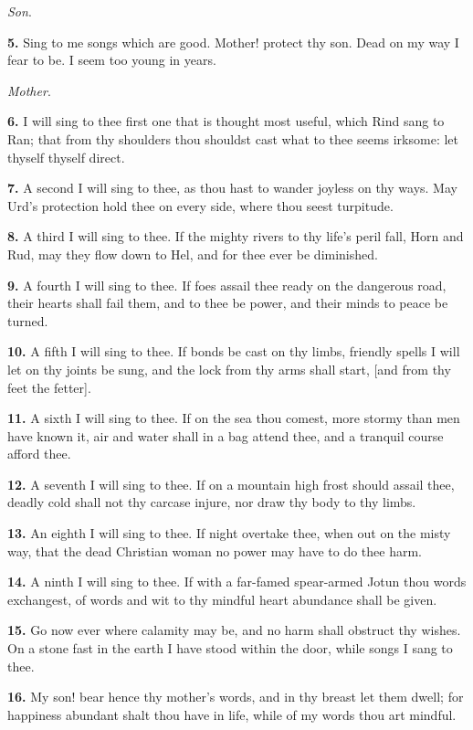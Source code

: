 \emph{Son}.

\textbf{5.} Sing to me songs which are good. Mother! protect thy son. Dead on
my way I fear to be. I seem too young in years.

\emph{Mother}.

\textbf{6.} I will sing to thee first one that is thought most useful, which
Rind sang to Ran; that from thy shoulders thou shouldst cast what to
thee seems irksome: let thyself thyself direct.

\textbf{7.} A second I will sing to thee, as thou hast to wander joyless on
thy ways. May Urd's protection hold thee on every side, where thou
seest turpitude.

\textbf{8.} A third I will sing to thee. If the mighty rivers to thy life's
peril fall, Horn and Rud, may they flow down to Hel, and for thee ever
be diminished.

\textbf{9.} A fourth I will sing to thee. If foes assail thee ready on the
dangerous road, their hearts shall fail them, and to thee be power,
and their minds to peace be turned.

\textbf{10.} A fifth I will sing to thee. If bonds be cast on thy limbs,
friendly spells I will let on thy joints be sung, and the lock from
thy arms shall start, [and from thy feet the fetter].

\textbf{11.} A sixth I will sing to thee. If on the sea thou comest, more
stormy than men have known it, air and water shall in a bag attend
thee, and a tranquil course afford thee.

\textbf{12.} A seventh I will sing to thee. If on a mountain high frost
should assail thee, deadly cold shall not thy carcase injure, nor draw
thy body to thy limbs.

\textbf{13.} An eighth I will sing to thee. If night overtake thee, when out
on the misty way, that the dead Christian woman no power may have to
do thee harm.

\textbf{14.} A ninth I will sing to thee. If with a far-famed spear-armed
Jotun thou words exchangest, of words and wit to thy mindful heart
abundance shall be given.

\textbf{15.} Go now ever where calamity may be, and no harm shall obstruct
thy wishes. On a stone fast in the earth I have stood within the door,
while songs I sang to thee.

\textbf{16.} My son! bear hence thy mother's words, and in thy breast let
them dwell; for happiness abundant shalt thou have in life, while of
my words thou art mindful.

